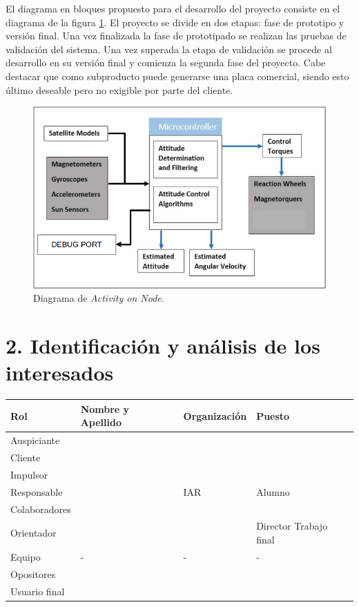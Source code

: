 \documentclass[
11pt, %
]{charter}
\begin{document}
 El diagrama en bloques propuesto para el desarrollo del proyecto consiste en el diagrama de la figura \ref{fig:adcs}. El proyecto se divide en dos etapas: fase de prototipo y versión final. Una vez finalizada la fase de prototipado se realizan las pruebas de validación del sistema.  Una vez superada la etapa de validación se procede al desarrollo en su versión final y comienza la segunda fase del proyecto. 
 Cabe destacar que como subproducto puede generarse una placa comercial, siendo esto último deseable pero no exigible por parte del cliente. 

\begin{figure}[htpb]
	\centering 
	\includegraphics[width=.8\textwidth]{Figuras/sistemaadcs.png}
	\caption{Diagrama de \textit{Activity on Node}.}
	\label{fig:adcs}
\end{figure}

\section{2. Identificación y análisis de los interesados}
\label{sec:interesados}


\begin{table}[ht]
	\begin{tabularx}{\linewidth}{@{}|l|X|X|l|@{}}
		\hline
		\rowcolor[HTML]{C0C0C0} 
		Rol           & Nombre y Apellido & Organización 	& Puesto 	\\ \hline
		Auspiciante   &                   &              	&        	\\ \hline
		Cliente       & \clientename      &\empclientename	&        	\\ \hline
		Impulsor      &                   &              	&        	\\ \hline
		Responsable   & \authorname       & IAR        	& Alumno 	\\ \hline
		Colaboradores &                   &              	&        	\\ \hline
		Orientador    & \supname	      & \pertesupname 	& Director Trabajo final \\ \hline
		Equipo        &  -                &  -             	& -        	\\ \hline
		Opositores    &                   &              	&        	\\ \hline
		Usuario final & \supname     &      \pertesupname        	&        	\\ \hline
	\end{tabularx}
\end{table}
\end{document}

